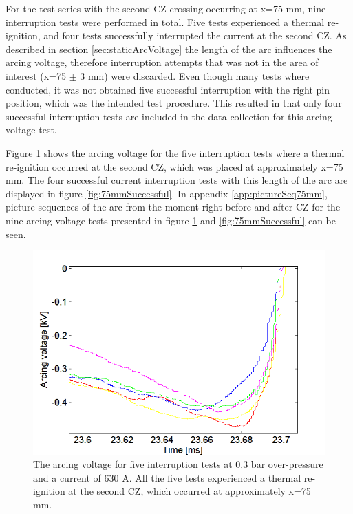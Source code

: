 \documentclass[10pt,b5paper,twoside]{article}
\begin{document}
For the test series with the second CZ crossing occurring at x=75 mm, nine interruption tests were performed in total. Five tests experienced a thermal re-ignition, and four tests successfully interrupted the current at the second CZ. As described in section \ref{sec:staticArcVoltage} the length of the arc influences the arcing voltage, therefore interruption attempts that was not in the area of interest (x=75 $\pm$ 3 mm) were discarded. Even though many tests where conducted, it was not obtained five successful interruption with the right pin position, which was the intended test procedure. This resulted in that only four successful interruption tests are included in the data collection for this arcing voltage test.

Figure \ref{fig:75mmUnSuccessful} shows the arcing voltage for the five interruption tests where a thermal re-ignition occurred at the second CZ, which was placed at approximately x=75 mm. The four successful current interruption tests with this length of the arc are displayed in figure \ref{fig:75mmSuccessful}. In appendix \ref{app:pictureSeq75mm}, picture sequences of the arc from the moment right before and after CZ for the nine arcing voltage tests presented in figure \ref{fig:75mmUnSuccessful} and \ref{fig:75mmSuccessful} can be seen.

\begin{figure}[H]
\centering
\includegraphics[scale=0.6, angle =0 ]{Bilder/Results/ArcingVoltage_75_reIgnition.PNG}
\caption{The arcing voltage for five interruption tests at 0.3 bar over-pressure and a current of 630 A. All the five tests experienced a thermal re-ignition at the second CZ, which occurred at approximately  x=75 mm.} \label{fig:75mmUnSuccessful}
\end{figure}
\end{document}
